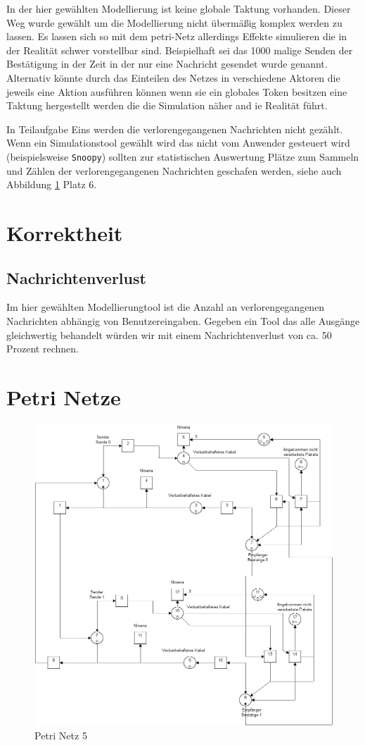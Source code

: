 \documentclass[10pt]{scrartcl}
\begin{document}
In der hier gewählten Modellierung ist keine globale Taktung vorhanden. Dieser Weg wurde gewählt um die Modellierung nicht übermäßig komplex werden zu lassen. Es lassen sich so mit dem petri-Netz allerdings Effekte simulieren die in der Realität schwer vorstellbar sind. Beispielhaft sei das 1000 malige Senden der Bestätigung in der Zeit in der nur eine Nachricht gesendet wurde genannt.   
Alternativ könnte durch das Einteilen des Netzes in verschiedene Aktoren die jeweils eine Aktion ausführen können wenn sie ein globales Token besitzen eine Taktung hergestellt werden die die Simulation näher and ie Realität führt. 

In Teilaufgabe Eins werden die verlorengegangenen Nachrichten nicht gezählt. Wenn ein Simulationstool gewählt wird das nicht vom Anwender gesteuert wird (beispielsweise \verb!Snoopy!) sollten zur statistischen Auswertung Plätze zum Sammeln und Zählen der verlorengegangenen Nachrichten geschafen werden, siehe auch Abbildung \ref{img:aufg5} Platz 6. 
	
\section{Korrektheit}



\subsection{Nachrichtenverlust}
Im hier gewählten Modellierungtool ist die Anzahl an verlorengegangenen Nachrichten abhängig von Benutzereingaben. Gegeben ein Tool das alle Ausgänge gleichwertig behandelt würden wir mit einem Nachrichtenverlust von ca. 50 Prozent rechnen.

\section{Petri Netze}

	\begin{figure}[H]
                \includegraphics[width=\textwidth]{praktikum1-aufgabe5.png}
        \caption{Petri Netz 5}
        \label{img:aufg5}
	\end{figure}
\end{document}
